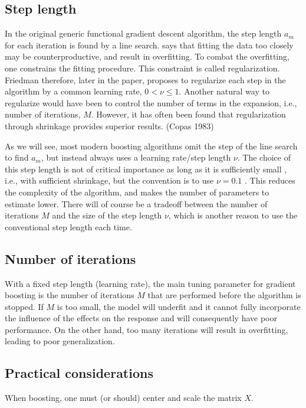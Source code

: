 \subsection{Step length}
In the original generic functional gradient descent algorithm, the step length $a_m$ for each iteration is found by a line search.
\citet{friedman2001} says that fitting the data too closely may be counterproductive, and result in overfitting. To combat the overfitting, one constrains the fitting procedure. This constraint is called regularization. Friedman therefore, later in the paper, proposes to regularize each step in the algorithm by a common learning rate, $0<\nu\leq1$. Another natural way to regularize would have been to control the number of terms in the expansion, i.e., number of iterations, $M$. However, it has often been found that regularization through shrinkage provides superior results. (Copas 1983) 

As we will see, most modern boosting algorithms omit the step of the line search to find $a_m$, but instead always uses a learning rate/step length $\nu$.  
The choice of this step length is not of critical importance as long as it is sufficiently small \citep{schmid-hothorn}, i.e., with sufficient shrinkage, but the convention is to use $\nu=0.1$ \citep{mayr14a}. This reduces the complexity of the algorithm, and makes the number of parameters to estimate lower. There will of course be a tradeoff between the number of iterations $M$ and the size of the step length $\nu$, which is another reason to use the conventional step length each time.

\subsection{Number of iterations}\label{subsec:iterations}
With a fixed step length (learning rate), the main tuning parameter for gradient boosting is the number of iterations $M$ that are performed before the algorithm is stopped. If $M$ is too small, the model will underfit and it cannot fully incorporate the influence of the effects on the response and will consequently have poor performance. On the other hand, too many iterations will result in overfitting, leading to poor generalization.

\subsection{Practical considerations}
When boosting, one must (or should) center and scale the matrix $X$.

